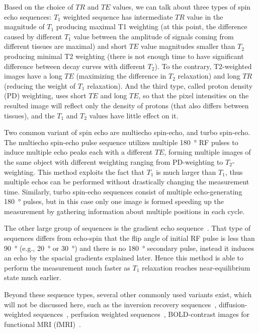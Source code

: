 Based on the choice of $TR$ and $TE$ values, we can talk about three types of spin echo sequences: $T_1$ weighted sequence has intermediate $TR$ value in the magnitude of $T_1$ producing maximal T1 weighting (at this point, the difference caused by different $T_1$ value between the amplitude of signals coming from different tissues are maximal) and short $TE$ value magnitudes smaller than $T_2$ producing minimal T2 weighting (there is not enough time to have significant difference between decay curves with different $T_2$). To the contrary, T2-weighted images have a long $TE$ (maximizing the difference in $T_2$ relaxation) and long $TR$ (reducing the weight of $T_1$ relaxation). And the third type, called proton density (PD) weighting, uses short $TE$ and long $TE$, so that the pixel intensities on the resulted image will reflect only the density of protons (that also differs between tissues), and the $T_1$ and $T_2$ values have little effect on it.

Two common variant of spin echo are multiecho spin-echo, and turbo spin-echo. The multiecho spin-echo pulse sequence utilizes multiple \SI{180}{\degree} RF pulses to induce multiple echo peaks each with a different $TE$, forming multiple images of the same object with different weighting ranging from PD-weighting to $T_2$-weighting. This method exploits the fact that $T_1$ is much larger than $T_1$, thus multiple echos can be performed without drastically changing the measurement time. Similarly, turbo spin-echo sequences consist of multiple echo-generating \SI{180}{\degree} pulses, but in this case only one image is formed speeding up the measurement by gathering information about multiple positions in each cycle.

The other large group of sequences is the gradient echo sequence~\cite{winkler_characteristics_1988}. That type of sequences differs from echo-spin that the flip angle of initial RF pulse is less than \SI{90}{\degree} (e.g., \SI{20}{\degree} or \SI{30}{\degree}) and there is no \SI{180}{\degree} secondary pulse, instead it induces an echo by the spacial gradients explained later. Hence this method is able to perform the measurement much faster as $T_1$ relaxation reaches near-equilibrium state much earlier.

Beyond these sequence types, several other commonly used variants exist, which will not be discussed here, such as the inversion recovery sequences~\cite{dwyer_short-ti_1988, fleckenstein_fast_1991, ashgriz_flair_1991, bedell_implementation_1998}, diffusion-weighted sequences~\cite{moseley_diffusion-weighted_1990, bammer_basic_2003}, perfusion weighted sequences~\cite{rosen_perfusion_1990, detre_perfusion_1992, barbier_methodology_2001}, BOLD-contrast images for functional MRI (fMRI)~\cite{ogawa_brain_1990, kwong_dynamic_1992}.

